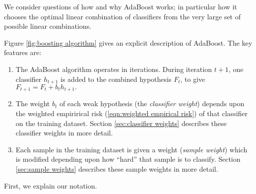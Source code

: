 We consider questions of how and why AdaBoost works; in
particular how it chooses the optimal linear combination of
classifiers from the very large set of possible linear combinations.

Figure \ref{fig:boosting algorithm} gives an explicit description of
AdaBoost.  The key features are:
%
\begin{enumerate}
\item	The AdaBoost algorithm operates in iterations.  During
	iteration $t+1$, one classifier $h_{t+1}$ is added to the combined
	hypothesis $F_{t}$, to give $F_{t+1} = F_t + b_t h_{t+1}.$
\item	The weight $b_t$ of each weak hypothesis (the \emph{classifier
	weight}) depends upon the weighted empirirical risk
	(\ref{eqn:weighted empirical risk}) of that classifier on the
	training dataset.  Section \ref{sec:classifier weights}
	describes these classifier weights in more detail. 
\item	Each sample in the training dataset is given a weight
	(\emph{sample weight}) which is modified depending upon how
	``hard'' that sample is to classify.  Section \ref{sec:sample
	weights} describes these sample weights in more detail.
\end{enumerate}
%
First, we explain our notation.


